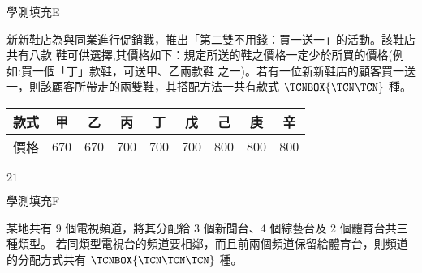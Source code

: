 \begin{QUESTIONS}
    \begin{QUESTION}
        \begin{ExamInfo}{95}{學測}{填充}{E}
        \end{ExamInfo}
        \begin{ExamAnsRateInfo}{68}{89}{75}{40}
        \end{ExamAnsRateInfo}
        \begin{QBODY}
            新新鞋店為與同業進行促銷戰，推出「第二雙不用錢：買一送一」的活動。該鞋店共有八款 鞋可供選擇,其價格如下：規定所送的鞋之價格一定少於所買的價格(例如:買一個「丁」款鞋，可送甲、乙兩款鞋 之一)。若有一位新新鞋店的顧客買一送一，則該顧客所帶走的兩雙鞋，其搭配方法一共有款式 
			$\TCNBOX{\TCN\TCN}$ 種。 
			\vspace*{0cm} 
			\begin{center}\begin{tabular}{|c|c|c|c|c|c|c|c|c|}  \hline 
			款式 & 甲 &乙 &丙 & 丁 &戊 & 己& 庚& 辛 \\ \hline 
			價格 & 670 & 670 & 700  & 700  & 700  & 800   & 800  & 800\\\hline
			\end{tabular}\end{center}
        \end{QBODY}
        \begin{QFROMS}
        \end{QFROMS}
        \begin{QTAGS}\end{QTAGS}
        \begin{QANS}
            $21$
        \end{QANS}
        \begin{QSOLLIST}
        \end{QSOLLIST}
        \begin{QEMPTYSPACE}
        \end{QEMPTYSPACE}
    \end{QUESTION}
    \begin{QUESTION}
        \begin{ExamInfo}{95}{學測}{填充}{F}
        \end{ExamInfo}
        \begin{ExamAnsRateInfo}{44}{81}{44}{7}
        \end{ExamAnsRateInfo}
        \begin{QBODY}
            某地共有 9 個電視頻道，將其分配給 3 個新聞台、4 個綜藝台及 2 個體育台共三種類型。 若同類型電視台的頻道要相鄰，而且前兩個頻道保留給體育台，則頻道的分配方式共有 $\TCNBOX{\TCN\TCN\TCN}$ 種。

\end{QBODY}
\end{QUESTION}
\end{QUESTIONS}
